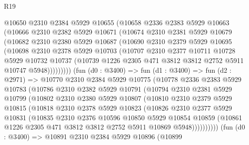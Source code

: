 \begin{lexlean}{R19}
\begin{coremodule}
        @10650
          @2310
          @2384
          @5929
          @10655
          (@10658
            @2336
            @2383
            @5929
            @10663
            (@10666
              @2310
              @2382
              @5929
              @10671
              (@10674
                @2310
                @2381
                @5929
                @10679
                (@10682
                  @2310
                  @2380
                  @5929
                  @10687
                  (@10690
                    @2310
                    @2379
                    @5929
                    @10695
                    (@10698
                      @2310
                      @2378
                      @5929
                      @10703
                      (@10707
                        @2310
                        @2377
                        @10711
                        @10728
                        @5929
                        @10732
                        @10737
                        (@10739 @1226 @2305 @471 @3812 @3812 @2752 @5911 @10747 @5948)))))))))
        (fun (d0 : @3400) =>
        fun (d1 : @3400) =>
        fun (d2 : @2971) =>
        @10770
          @2310
          @2384
          @5929
          @10775
          (@10778
            @2336
            @2383
            @5929
            @10783
            (@10786
              @2310
              @2382
              @5929
              @10791
              (@10794
                @2310
                @2381
                @5929
                @10799
                (@10802
                  @2310
                  @2380
                  @5929
                  @10807
                  (@10810
                    @2310
                    @2379
                    @5929
                    @10815
                    (@10818
                      @2310
                      @2378
                      @5929
                      @10823
                      (@10826
                        @2310
                        @2377
                        @5929
                        @10831
                        (@10835
                          @2310
                          @2376
                          @10596
                          @10850
                          @5929
                          @10854
                          @10859
                          (@10861 @1226 @2305 @471 @3812 @3812 @2752 @5911 @10869 @5948))))))))))
        (fun (d0 : @3400) =>
        @10891
          @2310
          @2384
          @5929
          @10896
          (@10899

\end{coremodule}
\end{lexlean}
